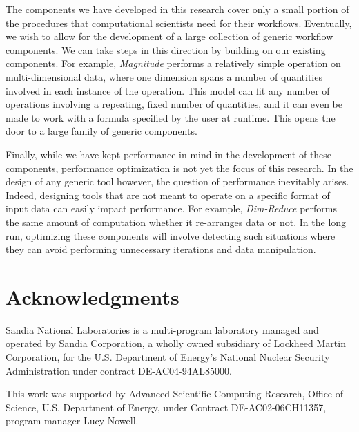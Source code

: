 \documentclass[conference]{IEEEtran}
\begin{document}
The components we have developed in this research cover only a small portion of
the procedures that computational scientists need for their
workflows. Eventually, we wish to allow for the development of a large
collection of generic workflow components. We can take steps in this direction
by building on our existing components. For example, {\em Magnitude} performs a
relatively simple operation on multi-dimensional data, where one dimension
spans a number of quantities involved in each instance of the operation. This
model can fit any number of operations involving a repeating, fixed number of
quantities, and it can even be made to work with a formula specified by the
user at runtime. This opens the door to a large family of generic components.

Finally, while we have kept performance in mind in the development of these
components, performance optimization is not yet the focus of this research. In
the design of any generic tool however, the question of performance inevitably
arises. Indeed, designing tools that are not meant to operate on a specific
format of input data can easily impact performance. For example, {\em
Dim-Reduce} performs the same amount of computation whether it re-arranges data
or not. In the long run, optimizing these components will involve detecting
such situations where they can avoid performing unnecessary iterations and data
manipulation.

\section*{Acknowledgments}

Sandia National Laboratories is a multi-program laboratory managed and operated
by Sandia Corporation, a wholly owned subsidiary of Lockheed Martin
Corporation, for the U.S. Department of Energy's National Nuclear Security
Administration under contract DE-AC04-94AL85000.

This work was supported by Advanced Scientific Computing Research, Office of
Science, U.S. Department of Energy, under Contract DE-AC02-06CH11357, program
manager Lucy Nowell.




\vfill\eject
\end{document}
